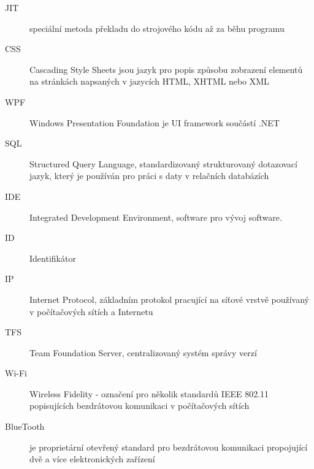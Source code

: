\begin{description}
    \item[JIT] speciální metoda překladu do strojového kódu až za běhu programu
    \item[CSS] Cascading Style Sheets jsou jazyk pro popis způsobu zobrazení elementů na stránkách napsaných v jazycích HTML, XHTML nebo XML
    \item[WPF] Windows Presentation Foundation je UI framework součástí .NET
    \item[SQL] Structured Query Language, standardizovaný strukturovaný dotazovací jazyk, který je používán pro práci s daty v relačních databázích
    \item[IDE] Integrated Development Environment, software pro vývoj software.
    \item[ID] Identifikátor
    \item[IP] Internet Protocol, základním protokol pracující na síťové vrstvě používaný v počítačových sítích a Internetu
    \item[TFS] Team Foundation Server, centralizovaný systém správy verzí
    \item[Wi-Fi] Wireless Fidelity - označení pro několik standardů IEEE 802.11 popisujících bezdrátovou komunikaci v počítačových sítích
    \item[BlueTooth] je proprietární otevřený standard pro bezdrátovou komunikaci propojující dvě a více elektronických zařízení
\end{description}